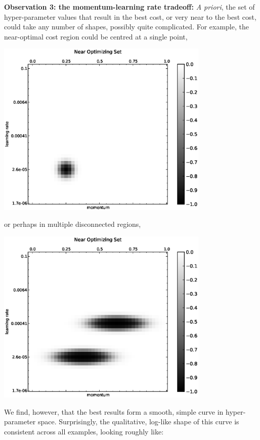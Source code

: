 \documentclass[10pt]{article}
\begin{document}
\textbf{Observation 3: the momentum-learning rate tradeoff:} \emph{A
  priori}, the set of hyper-parameter values that result in the best
cost, or very near to the best cost, could take any number of shapes,
possibly quite complicated. For example, the near-optimal cost region
could be centred at a single point,
%
\begin{center}
\includegraphics[width=4in]{plots/detailed/OptimalPretend1.eps}
\end{center}
%
or perhaps in multiple disconnected regions,
%
\begin{center}
\includegraphics[width=4in]{plots/detailed/OptimalPretend2.eps}
\end{center}
%
We find, however, that the best results form a smooth, simple curve in
hyper-parameter space.  Surprisingly, the qualitative, log-like shape
of this curve is consistent across all examples, looking roughly like: 
%
\\
%
\end{document}
